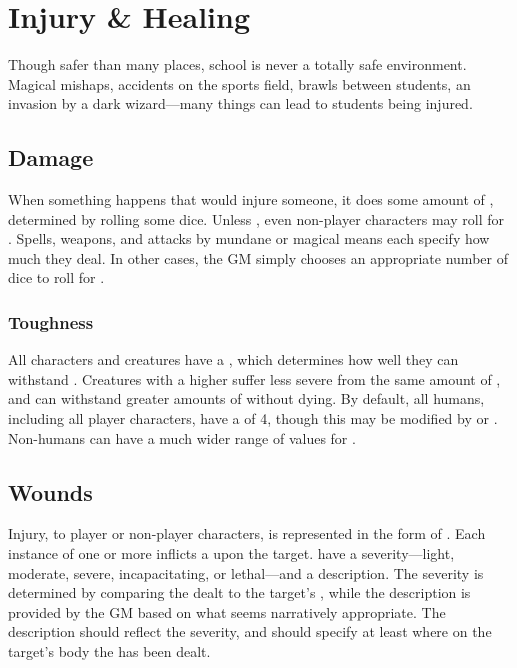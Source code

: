 \section{Injury \& Healing}

Though safer than many places, school is never a totally safe environment.
Magical mishaps, accidents on the sports field, brawls between students, an invasion by a dark wizard---many things can lead to students being injured.

\subsection{Damage}

When something happens that would injure someone, it does some amount of {\damage}, determined by rolling some dice.
Unless {\tests}, even non-player characters may roll for {\damage}.
Spells, weapons, and attacks by mundane or magical means each specify how much {\damage} they deal.
In other cases, the GM simply chooses an appropriate number of dice to roll for {\damage}.

\subsubsection{Toughness}

All characters and creatures have a {\toughness}, which determines how well they can withstand {\damage}.
Creatures with a higher {\toughness} suffer less severe {\wounds} from the same amount of {\damage}, and can withstand greater amounts of {\damage} without dying.
By default, all humans, including all player characters, have a {\toughness} of 4, though this may be modified by {\virtues} or {\flaws}.
Non-humans can have a much wider range of values for {\toughness}.

\subsection{Wounds}

Injury, to player or non-player characters, is represented in the form of {\wounds}.
Each instance of one or more {\damage} inflicts a {\wound} upon the target.
\capital{\wounds} have a severity---light, moderate, severe, incapacitating, or lethal---and a description.
The severity is determined by comparing the {\damage} dealt to the target's {\toughness}, while the description is provided by the GM based on what seems narratively appropriate.
The description should reflect the severity, and should specify at least where on the target's body the {\wound} has been dealt.

